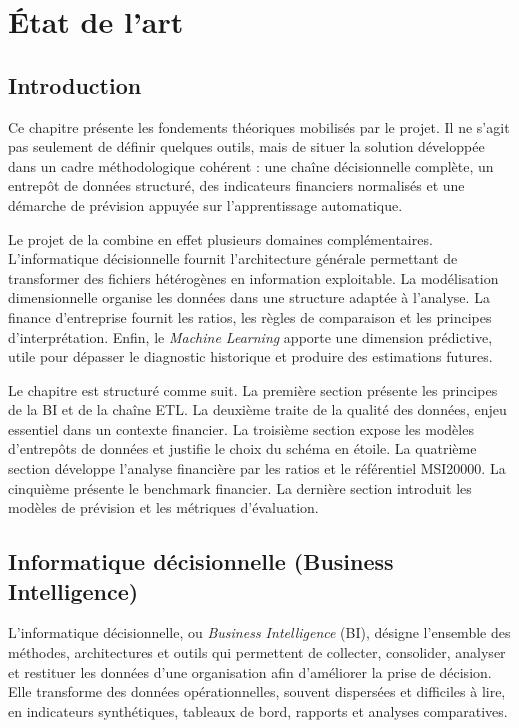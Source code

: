 \chapter{État de l'art}
\label{chapter:etatart}


\section*{Introduction}
\par Ce chapitre présente les fondements théoriques mobilisés par le projet. Il
ne s'agit pas seulement de définir quelques outils, mais de situer la solution
développée dans un cadre méthodologique cohérent : une chaîne décisionnelle
complète, un entrepôt de données structuré, des indicateurs financiers
normalisés et une démarche de prévision appuyée sur l'apprentissage automatique.

\par Le projet de la \sfbt combine en effet plusieurs domaines complémentaires.
L'informatique décisionnelle fournit l'architecture générale permettant de
transformer des fichiers hétérogènes en information exploitable. La modélisation
dimensionnelle organise les données dans une structure adaptée à l'analyse. La
finance d'entreprise fournit les ratios, les règles de comparaison et les
principes d'interprétation. Enfin, le \textit{Machine Learning} apporte une
dimension prédictive, utile pour dépasser le diagnostic historique et produire
des estimations futures.

\par Le chapitre est structuré comme suit. La première section présente les
principes de la \ac{BI} et de la chaîne \ac{ETL}. La deuxième traite de la
qualité des données, enjeu essentiel dans un contexte financier. La troisième
section expose les modèles d'entrepôts de données et justifie le choix du schéma
en étoile. La quatrième section développe l'analyse financière par les ratios et
le référentiel MSI20000. La cinquième présente le benchmark financier. La
dernière section introduit les modèles de prévision et les métriques
d'évaluation.

\section{Informatique décisionnelle (Business Intelligence)}
\label{sec:bi}
\par L'informatique décisionnelle, ou \textit{Business Intelligence} (\ac{BI}),
désigne l'ensemble des méthodes, architectures et outils qui permettent de
collecter, consolider, analyser et restituer les données d'une organisation afin
d'améliorer la prise de décision. Elle transforme des données opérationnelles,
souvent dispersées et difficiles à lire, en indicateurs synthétiques, tableaux de
bord, rapports et analyses comparatives.

